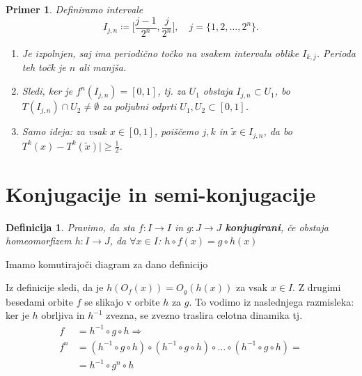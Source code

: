 \documentclass{article}
\newtheorem{definicija}{Definicija}
\newtheorem{primer}{Primer}
\begin{document}
\begin{primer}
Definiramo intervale 
$$
I_{j, n} \coloneqq \Big[\frac{j-1}{2^n}, \frac{j}{2^n}\Big], \quad j = \{1, 2, \dots, 2^n\}.
$$

\begin{enumerate}
\item[c1)] Je izpolnjen, saj ima periodično točko na vsakem intervalu oblike $I_{k, j}$.
Perioda teh točk je $n$ ali manjša.
\item[ii)] Sledi, ker je $f^n(I_{j,n}) = [0, 1]$, tj.
za $U_1$ obstaja $I_{j, n} \subset U_1$, bo $T(I_{j, n}) \cap U_2 \neq \emptyset$ za poljubni odprti $U_1, U_2 \subset [0, 1]$.
\item[c3)] Samo ideja: za vsak $x\in [0, 1]$, poiščemo $j, k$ in $\tilde{x} \in I_{j, n}$, 
da bo $T^k(x) - T^k(\tilde{x})| \geq \frac{1}{2}$.
\end{enumerate}
\end{primer}

\section{Konjugacije in semi-konjugacije}

\begin{definicija}
Pravimo, da sta $f: I \rightarrow I$ in $g: J \rightarrow J$ \textbf{konjugirani}, če obstaja homeomorfizem $h:I \rightarrow J$, da $\forall x\in I$: $h \circ f(x) = g\circ h(x) $
\end{definicija}
Imamo komutirajoči diagram za dano definicijo
\begin{centering}
\end{centering}

Iz definicije sledi, da je $h(O_f(x)) = O_g(h(x))$ za vsak $x\in I$. Z drugimi 
besedami orbite $f$ se slikajo v orbite $h$ za $g$. To vodimo iz naslednjega razmisleka: 
ker je $h$ obrljiva in $h^{-1}$ zvezna, se zvezno traslira celotna dinamika tj.
\begin{align*}
f &= h^{-1} \circ g \circ h \Longrightarrow\\ 
f^n &= (h^{-1} \circ g \circ h) \circ (h^{-1} \circ g \circ h) \circ \dots \circ (h^{-1} \circ g \circ h) = \\ 
&= h^{-1} \circ g^n \circ h
\end{align*}
\end{document}
